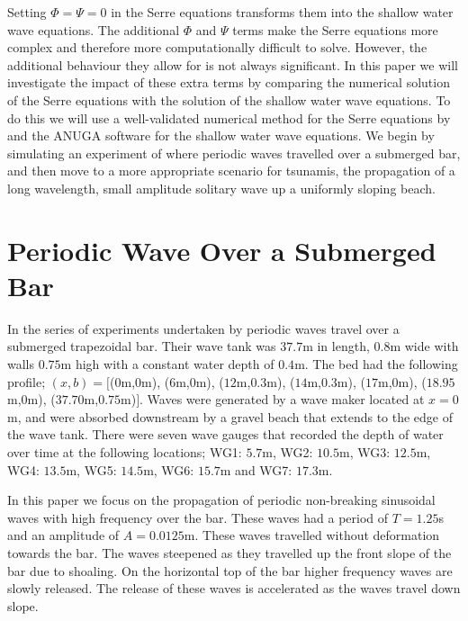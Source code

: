 \documentclass[a4paper,fleqn]{article} %
\begin{document}
Setting $\Phi = \Psi = 0$ in the Serre equations transforms them into the shallow water wave equations. The additional $\Phi$ and $\Psi$ terms make the Serre equations more complex and therefore more computationally difficult to solve. However, the additional behaviour they allow for is not always significant. In this paper we will investigate the impact of these extra terms by comparing the numerical solution of the Serre equations with the solution of the shallow water wave equations. To do this we will use a well-validated numerical method for the Serre equations by \cite{Zoppou-etal-2017} and the ANUGA software for the shallow water wave equations. We begin by simulating an experiment of \cite{Beji-Battjes-1994} where periodic waves travelled over a submerged bar, and then move to a more appropriate scenario for tsunamis, the propagation of a long wavelength, small amplitude solitary wave up a uniformly sloping beach.

\section{Periodic Wave Over a Submerged Bar}
\label{Oscillatory Wave Over a Submerged Bar}
In the series of experiments undertaken by \cite{Beji-Battjes-1994} periodic waves travel over a submerged trapezoidal bar. Their wave tank was $37.7$m in length, $0.8$m wide with walls $0.75$m high with a constant water depth of $0.4$m. The bed had the following profile; $(x,b) = [$($0$m,$0$m), ($6$m,$0$m), ($12$m,$0.3$m), ($14$m,$0.3$m), ($17$m,$0$m), ($18.95$m,$0$m), ($37.70$m,$0.75$m)$]$. Waves were generated by a wave maker located at $x=0$m, and were absorbed downstream by a gravel beach that extends to the edge of the wave tank. There were seven wave gauges that recorded the depth of water over time at the following locations; WG1: $5.7$m, WG2: $10.5$m, WG3: $12.5$m, WG4: $13.5$m, WG5: $14.5$m, WG6: $15.7$m and WG7: $17.3$m.

In this paper we focus on the propagation of periodic non-breaking sinusoidal waves with high frequency over the bar. These waves had a period of $T = 1.25$s and an amplitude of $A = 0.0125$m. These waves travelled without deformation towards the bar. The waves steepened as they travelled up the front slope of the bar due to shoaling. On the horizontal top of the bar higher frequency waves are slowly released. The release of these waves is accelerated as the waves travel down slope. 
\end{document}
